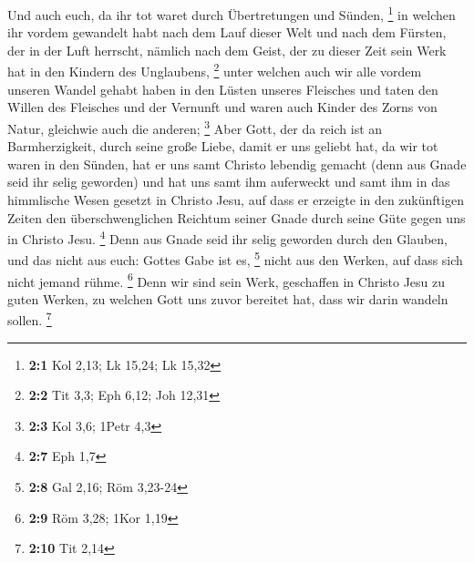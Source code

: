  Und auch euch, da ihr tot waret durch Übertretungen und
Sünden, \footnote{\textbf{2:1} Kol 2,13; Lk 15,24; Lk 15,32}
 in welchen ihr vordem gewandelt habt nach dem Lauf dieser
Welt und nach dem Fürsten, der in der Luft herrscht, nämlich nach dem
Geist, der zu dieser Zeit sein Werk hat in den Kindern des Unglaubens,
\footnote{\textbf{2:2} Tit 3,3; Eph 6,12; Joh 12,31} 
unter welchen auch wir alle vordem unseren Wandel gehabt haben in den
Lüsten unseres Fleisches und taten den Willen des Fleisches und der
Vernunft und waren auch Kinder des Zorns von Natur, gleichwie auch die
anderen; \footnote{\textbf{2:3} Kol 3,6; 1Petr 4,3}  Aber
Gott, der da reich ist an Barmherzigkeit, durch seine große Liebe, damit
er uns geliebt hat,  da wir tot waren in den Sünden, hat
er uns samt Christo lebendig gemacht (denn aus Gnade seid ihr selig
geworden)  und hat uns samt ihm auferweckt und samt ihm in
das himmlische Wesen gesetzt in Christo Jesu,  auf dass er
erzeigte in den zukünftigen Zeiten den überschwenglichen Reichtum seiner
Gnade durch seine Güte gegen uns in Christo Jesu. \footnote{\textbf{2:7}
  Eph 1,7}  Denn aus Gnade seid ihr selig geworden durch
den Glauben, und das nicht aus euch: Gottes Gabe ist es, \footnote{\textbf{2:8}
  Gal 2,16; Röm 3,23-24}  nicht aus den Werken, auf dass
sich nicht jemand rühme. \footnote{\textbf{2:9} Röm 3,28; 1Kor 1,19}
 Denn wir sind sein Werk, geschaffen in Christo Jesu zu
guten Werken, zu welchen Gott uns zuvor bereitet hat, dass wir darin
wandeln sollen. \footnote{\textbf{2:10} Tit 2,14}

